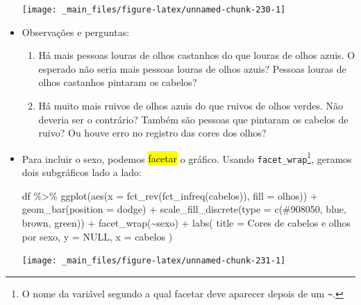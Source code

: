 \documentclass[
  11pt]{report}
\newenvironment{Shaded}{\begin{snugshade}}{\end{snugshade}}
\newcommand{\AttributeTok}[1]{\textcolor[rgb]{0.77,0.63,0.00}{#1}}
\newcommand{\ConstantTok}[1]{\textcolor[rgb]{0.00,0.00,0.00}{#1}}
\newcommand{\FunctionTok}[1]{\textcolor[rgb]{0.00,0.00,0.00}{#1}}
\newcommand{\NormalTok}[1]{#1}
\newcommand{\SpecialCharTok}[1]{\textcolor[rgb]{0.00,0.00,0.00}{#1}}
\newcommand{\StringTok}[1]{\textcolor[rgb]{0.31,0.60,0.02}{#1}}
\renewenvironment{Shaded}{
    \begin{mdframed}[%
      roundcorner=2pt,%
      innerleftmargin=5pt,%
      innerrightmargin=5pt,%
      topline=true,%
      leftline=true,%
      rightline=true,%
      bottomline=true,%
      linewidth=0.5pt,%
      linecolor=black!20,%
      backgroundcolor=black!2,%
      skipabove=2ex,%
      skipbelow=2.5ex%
    ]%
  }
  {
    \end{mdframed}
  }
\begin{document}
\begin{itemize}
  \begin{center}\texttt{[image: \_main\_files/figure-latex/unnamed-chunk-230-1]} \end{center}
\item
  Observações e perguntas:

  \begin{enumerate}
  \def\labelenumi{\arabic{enumi}.}
  \item
    Há mais pessoas louras de olhos castanhos do que louras de olhos azuis. O esperado não seria mais pessoas louras de olhos azuis? Pessoas louras de olhos castanhos pintaram os cabelos?
  \item
    Há muito mais ruivos de olhos azuis do que ruivos de olhos verdes. Não deveria ser o contrário? Também são pessoas que pintaram os cabelos de ruivo? Ou houve erro no registro das cores dos olhos?
  \end{enumerate}
\item
  Para incluir o sexo, podemos {\hl{facetar}} o gráfico. Usando \texttt{facet\_wrap}\footnote{O nome da variável segundo a qual facetar deve aparecer depois de um \texttt{\textasciitilde{}}.}, geramos dois subgráficos lado a lado:

\begin{Shaded}
\begin{Highlighting}[]
\NormalTok{df }\SpecialCharTok{\%\textgreater{}\%} 
  \FunctionTok{ggplot}\NormalTok{(}\FunctionTok{aes}\NormalTok{(}\AttributeTok{x =} \FunctionTok{fct\_rev}\NormalTok{(}\FunctionTok{fct\_infreq}\NormalTok{(cabelos)), }\AttributeTok{fill =}\NormalTok{ olhos)) }\SpecialCharTok{+}
    \FunctionTok{geom\_bar}\NormalTok{(}\AttributeTok{position =} \StringTok{\textquotesingle{}dodge\textquotesingle{}}\NormalTok{) }\SpecialCharTok{+}
    \FunctionTok{scale\_fill\_discrete}\NormalTok{(}\AttributeTok{type =} \FunctionTok{c}\NormalTok{(}\StringTok{\textquotesingle{}\#908050\textquotesingle{}}\NormalTok{, }\StringTok{\textquotesingle{}blue\textquotesingle{}}\NormalTok{, }\StringTok{\textquotesingle{}brown\textquotesingle{}}\NormalTok{, }\StringTok{\textquotesingle{}green\textquotesingle{}}\NormalTok{)) }\SpecialCharTok{+}
    \FunctionTok{facet\_wrap}\NormalTok{(}\SpecialCharTok{\textasciitilde{}}\NormalTok{sexo) }\SpecialCharTok{+}
    \FunctionTok{labs}\NormalTok{(}
      \AttributeTok{title =} \StringTok{\textquotesingle{}Cores de cabelos e olhos por sexo\textquotesingle{}}\NormalTok{,}
      \AttributeTok{y =} \ConstantTok{NULL}\NormalTok{,}
      \AttributeTok{x =} \StringTok{\textquotesingle{}cabelos\textquotesingle{}}
\NormalTok{    )}
\end{Highlighting}
\end{Shaded}

  \begin{center}\texttt{[image: \_main\_files/figure-latex/unnamed-chunk-231-1]} \end{center}
\end{itemize}
\end{document}
